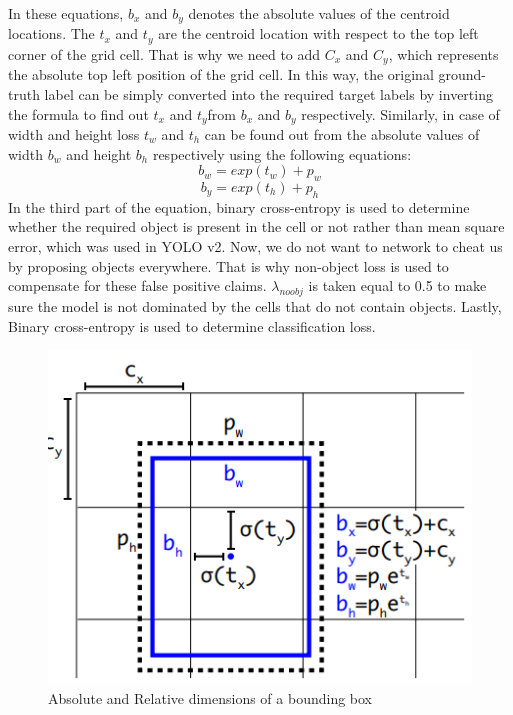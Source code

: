 In these equations, $b_{x}$ and $b_{y}$ denotes the absolute values of the centroid locations. The $t_{x}$ and $t_{y}$ are the centroid location with respect to the top left corner of the grid cell. That is why we need to add $C_{x}$ and $C_{y}$, which represents the absolute top left position of the grid cell. In this way, the original ground-truth label can be simply converted into the required target labels by inverting the formula to find out $t_{x}$ and $t_{y}$from $b_{x}$ and $b_{y}$ respectively. Similarly, in case of  width and height loss $t_w$ and $t_h$ can be found out from the absolute values of width $b_w$ and height $b_h$ respectively using the following equations:
\begin{equation}
    b_w = exp(t_w) + p_w
\end{equation}
\begin{equation}
    b_y = exp(t_h) + p_h
\end{equation}
In the third part of the equation, binary cross-entropy is used to determine whether the required object is present in the cell or not rather than mean square error, which was used in YOLO v2. Now, we do not want to network to cheat us by proposing objects everywhere. That is why non-object loss is used to compensate for these false positive claims. $\lambda_{noobj}$ is taken equal to 0.5 to make sure the model is not dominated by the cells that do not contain objects. Lastly, Binary cross-entropy is used to determine classification loss.
  \begin{figure}[H]
    \centering
    \captionsetup{justification = centering}
    \includegraphics[scale= 0.7]{CHAPTERS/Chapter-5/images/5.5.PNG}
    \caption{Absolute and Relative dimensions of a bounding box} 
    \label{fig:5.5}
  \end{figure}
  

